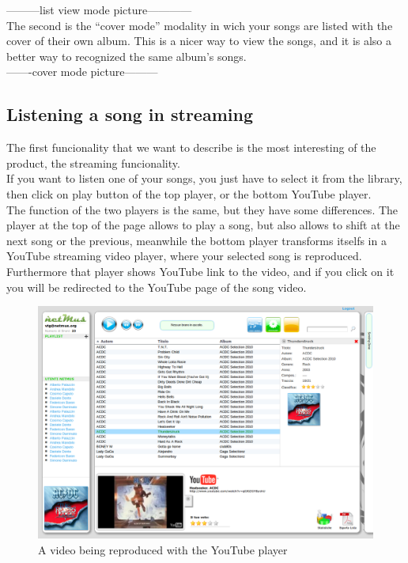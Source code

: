 ---------list view mode picture------------
\\

The second is the ``cover mode'' modality in wich your songs are listed with the
cover of their own album. This is a nicer way to view the songs, and it is also
a better way to recognized the same album's songs.\\

-------cover mode picture---------
\\

 \subsection*{Listening a song in streaming}

The first funcionality that we want to describe is the most interesting of the
product, the streaming funcionality.\\
If you want to listen one of your songs, you just have to select it from the
library, then click on play button of the top player, or the
bottom YouTube player.\\

The function of the two players is the same, but they have some differences.
The player at the top of the page allows to play a song, but also
allows to shift at the next song or the previous, meanwhile the bottom player
transforms itselfs in a YouTube streaming video player, where your selected song
is reproduced. Furthermore that player shows YouTube link to the video, and if
you click on it you will be redirected to the YouTube page of the song video.\\


\begin{figure}[htbp]
  \centering
  \includegraphics[width=15cm]{img/MU/player_youtube.png}
\caption{A video being reproduced with the YouTube player}
\end{figure} 

